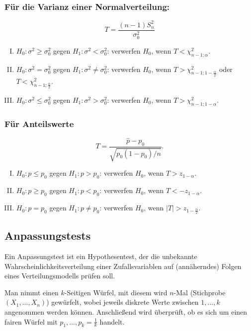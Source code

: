 \subsubsection{Für die Varianz einer Normalverteilung:}
\[T=\frac{(n-1)S_n^2}{\sigma_0^2}\]
\begin{enumerate}[(I)]
    \item $H_0:\sigma^2\ge\sigma_0^2$ gegen $H_1:\sigma^2<\sigma_0^2$:
    verwerfen $H_0$, wenn $T<\chi^2_{n-1;\alpha}$.
    \item $H_0:\sigma^2=\sigma_0^2$ gegen $H_1:\sigma^2\neq\sigma_0^2$:
    verwerfen $H_0$, wenn $T>\chi^2_{n-1;1-\frac{\alpha}{2}}$
    oder ${T<\chi^2_{n-1;\frac{\alpha}{2}}}$.
    \item $H_0:\sigma^2\le\sigma_0^2$ gegen $H_1:\sigma^2>\sigma_0^2$:
    verwerfen $H_0$, wenn $T>\chi^2_{n-1;1-\alpha}$.
\end{enumerate}
\subsubsection{Für Anteilswerte}
\[T=\frac{\hat p-p_0}{\sqrt{p_0(1-p_0)/n}}.\]
\begin{enumerate}[(I)]
    \item $H_0:p \le p_0$ gegen $H_1:p> p_0$:
    verwerfen $H_0$, wenn $T>z_{1-\alpha}$.
    \item $H_0:p \ge p_0$ gegen $H_1:p< p_0$:
    verwerfen $H_0$, wenn $T<-z_{1-\alpha}$.
    \item $H_0:p =p_0$ gegen $H_1:p\neq p_0$:
    verwerfen $H_0$, wenn $|T|>z_{1-\frac{\alpha}{2}}$.
\end{enumerate}

\ifdefined\uebsps


\fi

\subsection{Anpassungstests}
Ein Anpassungstest ist ein Hypothesentest, der die unbekannte Wahrscheinlichkeitsverteilung einer Zufallsvariablen auf (annäherndes) Folgen eines Verteilungsmodells prüfen soll.
\begin{bsp}\label{bsp:kwuerfel}
Man nimmt einen $k$-Seitigen Würfel, mit diesem wird $n$-Mal (Stichprobe $(X_1,...,X_n)$) gewürfelt, wobei jeweils diskrete Werte zwischen $1,...,k$ angenommen werden können. 
Anschließend wird überprüft, ob es sich um einen fairen Würfel mit ${p_1,...,p_k=\frac{1}{k}}$ handelt.
\end{bsp}

